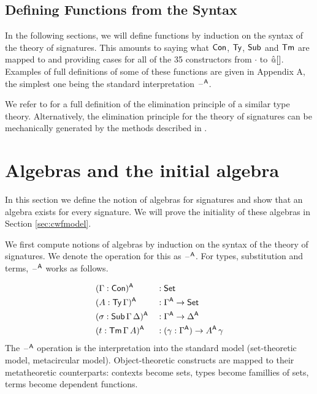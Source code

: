 \documentclass[acmsmall,screen]{acmart}
\begin{document}
\subsection{Defining Functions from the Syntax}
\label{sec:syntaxfunctions}

In the following sections, we will define functions by induction on
the syntax of the theory of signatures. This amounts to saying what
$\mathsf{Con}$, $\mathsf{Ty}$, $\mathsf{Sub}$ and $\mathsf{Tm}$ are mapped to and providing cases for
all of the 35 constructors from $\cdot$ to ${\mathop{\hat{\mathop{{\scriptstyle @}}}}[]}$. Examples of
full definitions of some of these functions are given in Appendix A,
the simplest one being the standard interpretation $\mathord{\hspace{1pt}\text{--}\hspace{1pt}}^{\mathsf{A}}$.

We refer to \cite{ttintt} for a full definition of the elimination
principle of a similar type theory. Alternatively, the elimination
principle for the theory of signatures can be mechanically generated
by the methods described in \cite{kaposi_et_al:LIPIcs:2018:9190}.


\section{Algebras and the initial algebra}
\label{sec:algebras}

In this section we define the notion of algebras for signatures and
show that an algebra exists for every signature. We will prove
the initiality of these algebras in Section \ref{sec:cwfmodel}.

We first compute notions of algebras by induction on the syntax of the
theory of signatures. We denote the operation for this as $\mathord{\hspace{1pt}\text{--}\hspace{1pt}}^{\mathsf{A}}$.
For types, substitution and terms, $\mathord{\hspace{1pt}\text{--}\hspace{1pt}}^{\mathsf{A}}$ works as follows.

\begin{alignat*}{5}
  & (\Gamma:\mathsf{Con})^{\mathsf{A}} && : \mathsf{Set} \\
  & (A:\mathsf{Ty}\,\Gamma)^{\mathsf{A}} && : \Gamma^{\mathsf{A}}\rightarrow\mathsf{Set} \\
  & (\sigma:\mathsf{Sub}\,\Gamma\,\Delta)^{\mathsf{A}} && : \Gamma^{\mathsf{A}}\rightarrow\Delta^{\mathsf{A}} \\
  & (t:\mathsf{Tm}\,\Gamma\,A)^{\mathsf{A}} && : (\gamma:\Gamma^{\mathsf{A}})\rightarrow A^{\mathsf{A}}\,\gamma
\end{alignat*}
The $\mathord{\hspace{1pt}\text{--}\hspace{1pt}}^{\mathsf{A}}$ operation is the interpretation into the standard
model (set-theoretic model, metacircular model). Object-theoretic
constructs are mapped to their metatheoretic counterparts: contexts
become sets, types become famillies of sets, terms become dependent
functions.
\end{document}
